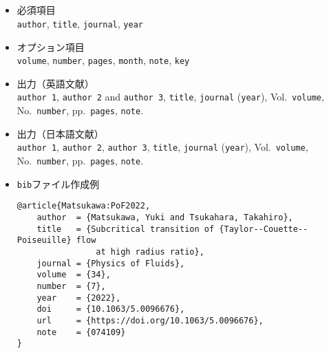 \documentclass[a4paper,fleqn,uplatex,dvipdfmx]{jsarticle}
\begin{document}
\subsection{\ttarticle}
\label{ssec:article}
\begin{screen}
    \begin{itemize}
        \item 必須項目 \\
        \verb|author|, \verb|title|, \verb|journal|, \verb|year|
        \item オプション項目 \\
        \verb|volume|, \verb|number|, \verb|pages|, \verb|month|, \verb|note|, \verb|key|
        \item 出力（英語文献） \\
            \colorbox[gray]{0.8}{\texttt{author 1}}, \colorbox[gray]{0.8}{\texttt{author 2}} and \colorbox[gray]{0.8}{\texttt{author 3}}, \colorbox[gray]{0.8}{\texttt{title}}, \colorbox[gray]{0.8}{\texttt{journal}} (\colorbox[gray]{0.8}{\texttt{year}}), Vol.~\colorbox[gray]{0.8}{\texttt{volume}}, No.~\colorbox[gray]{0.8}{\texttt{number}}, pp.~\colorbox[gray]{0.8}{\texttt{pages}}, \colorbox[gray]{0.8}{\texttt{note}}.
        \item 出力（日本語文献） \\
            \colorbox[gray]{0.8}{\texttt{author 1}}, \colorbox[gray]{0.8}{\texttt{author 2}}, \colorbox[gray]{0.8}{\texttt{author 3}}, \colorbox[gray]{0.8}{\texttt{title}}, \colorbox[gray]{0.8}{\texttt{journal}} (\colorbox[gray]{0.8}{\texttt{year}}), Vol.~\colorbox[gray]{0.8}{\texttt{volume}}, No.~\colorbox[gray]{0.8}{\texttt{number}}, pp.~\colorbox[gray]{0.8}{\texttt{pages}}, \colorbox[gray]{0.8}{\texttt{note}}.
        \item \verb|bib|ファイル作成例 \vspace{-3mm}
\begin{verbatim}
@article{Matsukawa:PoF2022,
    author  = {Matsukawa, Yuki and Tsukahara, Takahiro},
    title   = {Subcritical transition of {Taylor--Couette--Poiseuille} flow 
                at high radius ratio},
    journal = {Physics of Fluids},
    volume  = {34},
    number  = {7},
    year    = {2022},
    doi     = {10.1063/5.0096676},
    url     = {https://doi.org/10.1063/5.0096676},
    note    = {074109}
}
\end{verbatim}
    \end{itemize}
\end{screen}
\end{document}
